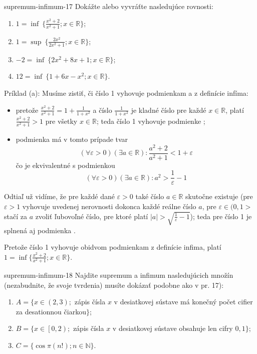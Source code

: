 \begin{defproblem}{supremum-infimum-17}
Dokážte alebo vyvráťte nasledujúce rovnosti:

\begin{enumerate}
  \item $1 = \inf \: \{ \frac{x^2 + 2}{x^2 + 1}; x \in \mathbb{R} \}$;
  \item $1 = \sup \: \{ \frac{2x^2}{2x^2 + 1}; x \in \mathbb{R} \}$;
  \item $-2 = \inf \: \{ 2x^2 + 8x + 1; x \in \mathbb{R} \}$;
  \item $12 = \inf \: \{ 1 + 6x - x^2; x \in \mathbb{R} \}$.
\end{enumerate}

\begin{solution}
  Príklad (a): Musíme zistiť, či číslo 1 vyhovuje podmienkam  a
   z definície infíma:

  \begin{itemize}
    \item[\ding{34}] pretože $\frac{x^2 + 2}{x^2 + 1} = 1 + \frac{1}{1 + x^2}$ a číslo
        $\frac{1}{1 + x^2}$ je kladné číslo pre každé $x \in \mathbb{R}$, platí
        $\frac{x^2 + 2}{x^2 + 1} > 1$ pre všetky $x \in \mathbb{R}$; teda číslo
        1 vyhovuje podmienke ;
    \item[\ding{37}] podmienka má v tomto prípade tvar
          $$(\forall \varepsilon > 0) (\exists a \in \mathbb{R}):
            \frac{a^2 + 2}{a^2 + 1} < 1 + \varepsilon$$
          čo je ekvivalentné s podmienkou
          $$(\forall \varepsilon > 0) (\exists a \in \mathbb{R}):
            a^2 > \frac{1}{\varepsilon} - 1$$
  \end{itemize}

  Odtiaľ už vidíme, že pre každé dané $\varepsilon > 0$ také číslo
  $a \in \mathbb{R}$ skutočne existuje (pre $\varepsilon > 1$ vyhovuje
  uvedenej nerovnosti dokonca každé reálne číslo $a$, pre
  $\varepsilon \in (0, 1>$ stačí za $a$ zvoliť ľubovoľné číslo, pre ktoré
  platí $|a| > \sqrt{\frac{1}{\varepsilon} - 1}$); teda pre číslo 1 je splnená
  aj podmienka .

  Pretože číslo 1 vyhovuje obidvom podmienkam z definície infima, platí
  $1 = \inf \{ \frac{x^2 + 2}{x^2 + 1}; x \in \mathbb{R} \}$.
\end{solution}
\end{defproblem}

\begin{defproblem}{supremum-infimum-18}
Najdite supremum a infimum nasledujúcich množín (nezabudnite, že svoje tvrdenia)
musíte dokázať podobne ako v pr. 17):

\begin{enumerate}[label=\arabic*.]
  \item $A = \{ x \in (2, 3);$ zápis čísla $x$ v desiatkovej sústave má konečný
        počet cifier za desationnou čiarkou$\}$;
  \item $B = \{ x \in \left[0, 2\right);$ zápis čísla $x$ v desiatkovej sústave obsahuje
        len cifry $0, 1 \}$;
  \item $C = \{ \cos \pi(n!); n \in \mathbb{N} \}$.
\end{enumerate}
\end{defproblem}

